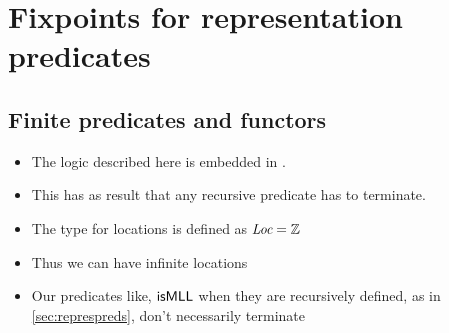 \documentclass[thesis.tex]{subfiles}
\begin{document}
\chapter{Fixpoints for representation predicates}
\label{ch:fixpoints}

\section{Finite predicates and functors}
\begin{itemize}
    \item The logic described here is embedded in \coq.
    \item This has as result that any recursive predicate has to terminate.
    \item The type for locations is defined as $\kern-0.05em\textit{Loc} = \mathbb{Z}$
    \item Thus we can have infinite locations
    \item Our predicates like, $\textsf{\upshape isMLL}$ when they are recursively defined, as in \cref*{sec:represpreds}, don't necessarily terminate
\end{itemize}
\end{document}
